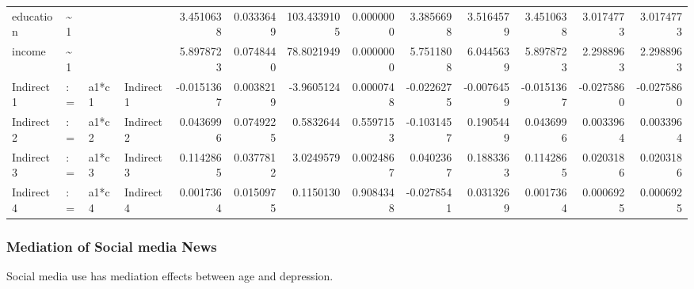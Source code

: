 \documentclass[
]{article}
\begin{document}
\begin{table}[!h]
\begin{tabular}[t]{llllrrrrrrrrr}
\addlinespace
education & \textasciitilde{}1 &  &  & 3.4510638 & 0.0333649 & 103.4339105 & 0.0000000 & 3.3856698 & 3.5164579 & 3.4510638 & 3.0174773 & 3.0174773\\
income & \textasciitilde{}1 &  &  & 5.8978723 & 0.0748440 & 78.8021949 & 0.0000000 & 5.7511808 & 6.0445639 & 5.8978723 & 2.2988963 & 2.2988963\\
Indirect1 & := & a1*c1 & Indirect1 & -0.0151367 & 0.0038219 & -3.9605124 & 0.0000748 & -0.0226275 & -0.0076459 & -0.0151367 & -0.0275860 & -0.0275860\\
Indirect2 & := & a1*c2 & Indirect2 & 0.0436996 & 0.0749225 & 0.5832644 & 0.5597153 & -0.1031457 & 0.1905449 & 0.0436996 & 0.0033964 & 0.0033964\\
Indirect3 & := & a1*c3 & Indirect3 & 0.1142865 & 0.0377812 & 3.0249579 & 0.0024867 & 0.0402367 & 0.1883363 & 0.1142865 & 0.0203186 & 0.0203186\\
\addlinespace
Indirect4 & := & a1*c4 & Indirect4 & 0.0017364 & 0.0150975 & 0.1150130 & 0.9084348 & -0.0278541 & 0.0313269 & 0.0017364 & 0.0006925 & 0.0006925\\
\bottomrule
\end{tabular}
\end{table}

\newpage

\hypertarget{mediation-of-social-media-news}{%
\subsubsection{Mediation of Social media
News}\label{mediation-of-social-media-news}}

Social media use has mediation effects between age and depression.
\end{document}
